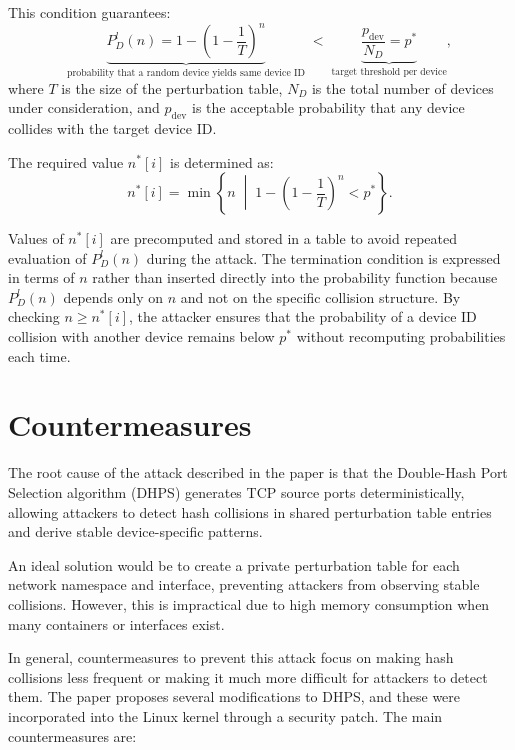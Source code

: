 \documentclass{report}
\begin{document}
This condition guarantees:
\[
  \underbrace{P^l_D(n) 
  = 1 - \left(1 - \frac{1}{T}\right)^n}_{\text{probability that a random device yields same device ID}}
  \;<\;
  \underbrace{\frac{p_{\text{dev}}}{N_D} = p^*}_{\text{target threshold per device}},
\]
where \( T \) is the \alert{size of the perturbation table}, \( N_D \) is the \alert{total number of devices} under consideration, and \( p_{\text{dev}} \) is the \alert{acceptable probability} that any device collides with the target device ID.

The required value \( n^*[i] \) is determined as:
\[
  n^*[i] 
  = \min \left\{ n \;\middle|\; 1 - \left(1 - \frac{1}{T}\right)^n < p^* \right\}.
\]

Values of \( n^*[i] \) are \alert{precomputed} and stored in a table to avoid repeated evaluation of \( P^l_D(n) \) during the attack. The termination condition is expressed in terms of \( n \) rather than inserted directly into the probability function because \( P^l_D(n) \) depends only on \( n \) and \alert{not on the specific collision structure}. By checking \( n \ge n^*[i] \), the attacker ensures that the probability of a device ID collision with another device remains below \( p^* \) \alert{without recomputing probabilities} each time.


\vspace{0.5cm}
\chapter{Countermeasures}
\label{sec:countermeasures}

The \alert{root cause} of the attack described in the paper is that the Double-Hash Port Selection algorithm (DHPS) generates TCP source ports deterministically, allowing attackers to detect hash collisions in shared perturbation table entries and derive stable device-specific patterns.

An \alert{ideal solution} would be to create a private perturbation table for each network namespace and interface, preventing attackers from observing stable collisions. However, this is impractical due to high memory consumption when many containers or interfaces exist.

In \alert{general}, \alert{countermeasures} to prevent this attack focus on making hash collisions less frequent or making it much more difficult for attackers to detect them. The paper proposes several modifications to DHPS, and these were incorporated into the Linux kernel through a security patch. The main countermeasures are:
\end{document}
